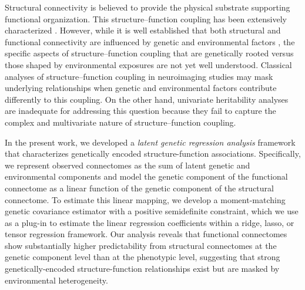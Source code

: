 \documentclass[12pt]{article}
\newcommand{\km}[1]{\textcolor{orange}{#1}}
\begin{document}
Structural connectivity is believed to provide the physical substrate supporting functional organization. This structure–function coupling has been extensively characterized \parencite{baum2020development, pan2025mapping, fotiadis2024structure}. However, while it is well established that both structural and functional connectivity are influenced by genetic \parencite{colclough2017heritability,elliott2018genomewide,gu2021heritability,bianco2023heritability} and environmental factors \parencite{kulick2020longterm,pini2023pollutome}, the specific aspects of structure–function coupling that are genetically rooted versus those shaped by environmental exposures are not yet well understood. Classical analyses of structure–function coupling in neuroimaging studies may mask underlying relationships when genetic and environmental factors contribute differently to this coupling. On the other hand, univariate heritability analyses are inadequate for addressing this question because they fail to capture the complex and multivariate nature of structure–function coupling.

In the present work, we developed a \textit{latent genetic regression analysis} framework that characterizes genetically encoded structure-function associations. Specifically, we represent observed connectomes as the sum of latent genetic and environmental components and model the genetic component of the functional connectome as a linear function of the genetic component of the structural connectome. To estimate this linear mapping, we develop a moment-matching genetic covariance estimator with a positive semidefinite constraint, which we use as a plug-in to estimate the linear regression coefficients within a ridge, lasso, or tensor regression framework. Our analysis reveals that functional connectomes show substantially higher predictability from structural connectomes at the genetic component level than at the phenotypic level, suggesting that strong genetically-encoded structure-function relationships exist but are masked by environmental heterogeneity. %






\end{document}
